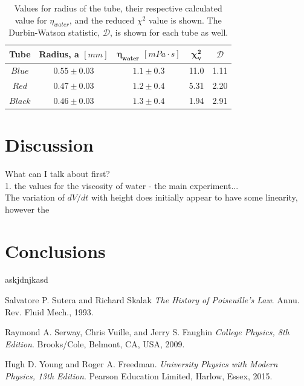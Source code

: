 \documentclass[twocolumn]{revtex4}
\begin{document}
\begin{table}[h!]
\centering
\begin{tabular}{ |c|c|c|c|c| } 
 \hline
 \textbf{Tube} & \textbf{Radius, a $[mm]$} & \textbf{$\boldsymbol{\eta_{water}}$ $[mPa\cdot{s}]$} & \textbf{$\boldsymbol{\chi^2_v}$} & $\mathcal{D}$\\ [0.5ex] 
 \hline\hline
 $Blue$ &$0.55\pm0.03$ & $1.1\pm0.3$ & 11.0 & 1.11\\ 
 $Red$ & $0.47\pm0.03$ & $1.2\pm0.4$ & 5.31 & 2.20\\
 $Black$ & $0.46\pm0.03$ & $1.3\pm0.4$ & 1.94 & 2.91\\
 
 \hline
\end{tabular}
\caption{Values for radius of the tube, their respective calculated value for $\eta_{water}$, and the reduced $\chi^2$ value is shown. The Durbin-Watson statistic, $\mathcal{D}$, is shown for each tube as well.  }
\label{table:1}
\end{table}

\vspace{-3ex}
\section{Discussion}
\vspace{-2ex}

What can I talk about first?\\
1. the values for the viscosity of water - the main experiment...\\

The variation of $dV/dt$ with height does initially appear to have some linearity, however the 



\vspace{-5ex}
\section{Conclusions}
\vspace{-2ex}
 
askjdnjkasd

\begin{thebibliography}{5}
	Salvatore P. Sutera and Richard Skalak
	\textit{The History of Poiseuille's Law}.
	Annu. Rev. Fluid Mech., 1993.
	
	Raymond A. Serway, Chris Vuille, and Jerry S. Faughin
	\textit{College Physics, 8th Edition}.
	Brooks/Cole, Belmont, CA, USA, 2009.

	Hugh D. Young and Roger A. Freedman.
	\textit{University Physics with Modern Physics, 13th Edition}. 
	Pearson Education Limited, Harlow, Essex, 2015.
	
\end{thebibliography}
\clearpage
\end{document}
